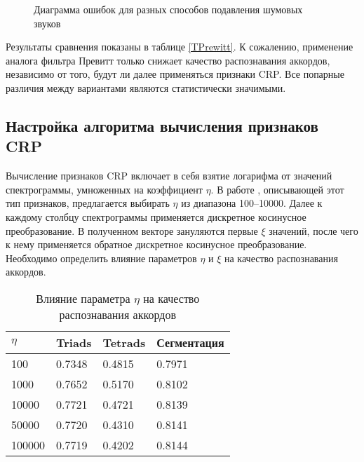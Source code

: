 \begin{figure}[htbp]
  \begin{minipage}[h]{0.49\linewidth}
  \end{minipage}
  \hfill
  \begin{minipage}[h]{0.49\linewidth}
  \end{minipage}
  \caption{Диаграмма ошибок для разных способов подавления шумовых звуков}
  \label{img:prewitt}
\end{figure}

Результаты сравнения показаны в таблице \ref{TPrewitt}. К сожалению, применение
аналога фильтра Превитт только снижает качество распознавания аккордов,
независимо от того, будут ли далее применяться признаки CRP. Все попарные
различия между вариантами являются статистически значимыми.

\subsection{Настройка алгоритма вычисления признаков CRP} \label{ssect3_crp}

Вычисление признаков CRP включает в себя взятие логарифма от значений
спектрограммы, умноженных на коэффициент $\eta$. В работе \cite{Mueller2009},
описывающей этот тип признаков, предлагается выбирать $\eta$ из диапазона
100--10000. Далее к каждому столбцу спектрограммы применяется дискретное
косинусное преобразование. В полученном векторе зануляются первые $\xi$
значений, после чего к нему применяется обратное дискретное косинусное
преобразование. Необходимо определить влияние параметров $\eta$ и $\xi$ на
качество распознавания аккордов.

\begin{table} [htbp]
  \centering
  \parbox{15cm}{\caption{Влияние параметра $\eta$ на качество распознавания
  аккордов} \label{Teta}}
  \begin{tabular}{|l|l|l|l|}
  \hline
  $\eta$ & Triads & Tetrads & Сегментация \\
  \hline
  100 & 0.7348 & 0.4815 & 0.7971 \\
  1000 & 0.7652 & 0.5170 & 0.8102 \\
  10000 & 0.7721 & 0.4721 & 0.8139 \\
  50000 & 0.7720 & 0.4310 & 0.8141 \\
  100000 & 0.7719 & 0.4202 & 0.8144 \\
  \hline
  \end{tabular}
\end{table}

